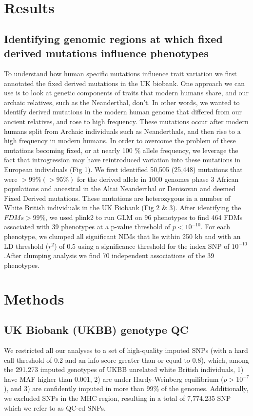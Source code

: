 \section{Results}
\subsection{Identifying genomic regions at which fixed derived mutations influence phenotypes}
To understand how human specific mutations influence trait variation we first annotated the fixed derived mutations in the UK biobank. One approach we can use is to look at genetic components of traits that modern humans share, and our archaic relatives, such as the Neanderthal, don’t. In other words, we wanted to identify derived mutations in the modern human genome that differed from our ancient relatives, and rose to high frequency. These mutations occur after modern humans split from Archaic individuals such as Neanderthals, and then rise to a high frequency in modern humans. In order to overcome the problem of these mutations becoming fixed, or at nearly 100 \% allele frequency, we leverage the fact that introgression may have reintroduced variation into these mutations in European individuals (Fig 1). We first identified 50,505 (25,448) mutations that were $>99\% (>95\%)$ for the derived allele in 1000 genomes phase 3 African populations and ancestral in the Altai Neanderthal or Denisovan and deemed Fixed Derived mutations. These mutations are heterozygous in a number of White British individuals in the UK Biobank (Fig 2 & 3). After identifying the $FDMs >99\%$, we used plink2 to run GLM on 96 phenotypes to find 464 FDMs associated with 39 phenotypes at a p-value threshold of $p<10^{-10}$.  For each phenotype, we clumped all significant NIMs that lie within 250 kb and with an LD threshold ($r^2$) of 0.5 using a significance threshold for the index SNP of $10^{-10}$.After clumping analysis we find 70 independent associations of the 39 phenotypes.
\subsection{}
\section{Methods}
\subsection{UK Biobank (UKBB) genotype QC}
We restricted all our analyses to a set of high-quality imputed SNPs (with a hard call threshold of 0.2 and an info score greater than or equal to 0.8), which, among the 291,273 imputed genotypes of UKBB unrelated white British individuals, 1) have MAF higher than 0.001, 2) are under Hardy-Weinberg equilibrium ($p > 10^{-7}$), and 3) are confidently imputed in more than 99\% of the genomes. Additionally, we excluded SNPs in the MHC region, resulting in a total of 7,774,235 SNP which we refer to as QC-ed SNPs.
